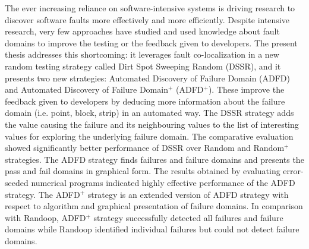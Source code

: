 The ever increasing reliance on software-intensive systems is driving research to discover software faults more effectively and more efficiently. Despite intensive research, very few approaches have studied and used knowledge about fault domains to improve the testing or the feedback given to developers. The present thesis addresses this shortcoming: it leverages fault co-localization in a new random testing strategy called Dirt Spot Sweeping Random (DSSR), and it presents two new strategies: Automated Discovery of Failure Domain (ADFD) and Automated Discovery of Failure Domain$^+$ (ADFD$^+$). These improve the feedback given to developers by deducing more information about the failure domain (i.e. point, block, strip) in an automated way.
The DSSR strategy adds the value causing the failure and its neighbouring values to the list of interesting values for exploring the underlying failure domain. The comparative evaluation showed significantly better performance of DSSR over Random and Random$^+$ strategies. The ADFD strategy finds failures and failure domains and presents the pass and fail domains in graphical form. The results obtained by evaluating error-seeded numerical programs indicated highly effective performance of the ADFD strategy. The ADFD$^+$ strategy is an extended version of ADFD strategy with respect to algorithm and graphical presentation of failure domains. In comparison with Randoop, ADFD$^+$ strategy successfully detected all failures and failure domains while Randoop identified individual failures but could not detect failure domains. 
